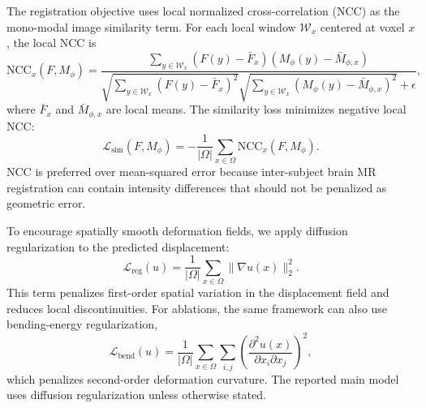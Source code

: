 
The registration objective uses local normalized cross-correlation (NCC) as the mono-modal image similarity term. For each local window $\mathcal{W}_{x}$ centered at voxel $x$, the local NCC is
\begin{equation}
    \mathrm{NCC}_{x}(F,M_{\phi})
    =
    \frac{
    \sum_{y \in \mathcal{W}_{x}}
    \left(F(y)-\bar{F}_{x}\right)
    \left(M_{\phi}(y)-\bar{M}_{\phi,x}\right)
    }{
    \sqrt{
    \sum_{y \in \mathcal{W}_{x}}
    \left(F(y)-\bar{F}_{x}\right)^2
    }
    \sqrt{
    \sum_{y \in \mathcal{W}_{x}}
    \left(M_{\phi}(y)-\bar{M}_{\phi,x}\right)^2
    }
    + \epsilon
    },
\end{equation}
where $\bar{F}_{x}$ and $\bar{M}_{\phi,x}$ are local means. The similarity loss minimizes negative local NCC:
\begin{equation}
    \mathcal{L}_{\mathrm{sim}}(F,M_{\phi})
    =
    -
    \frac{1}{|\Omega|}
    \sum_{x \in \Omega}
    \mathrm{NCC}_{x}(F,M_{\phi}).
\end{equation}
NCC is preferred over mean-squared error because inter-subject brain MR registration can contain intensity differences that should not be penalized as geometric error.


To encourage spatially smooth deformation fields, we apply diffusion regularization to the predicted displacement:
\begin{equation}
    \mathcal{L}_{\mathrm{reg}}(u)
    =
    \frac{1}{|\Omega|}
    \sum_{x \in \Omega}
    \|\nabla u(x)\|_{2}^{2}.
\end{equation}
This term penalizes first-order spatial variation in the displacement field and reduces local discontinuities. For ablations, the same framework can also use bending-energy regularization,
\begin{equation}
    \mathcal{L}_{\mathrm{bend}}(u)
    =
    \frac{1}{|\Omega|}
    \sum_{x \in \Omega}
    \sum_{i,j}
    \left(
    \frac{\partial^{2}u(x)}{\partial x_i \partial x_j}
    \right)^2,
\end{equation}
which penalizes second-order deformation curvature. The reported main model uses diffusion regularization unless otherwise stated.

